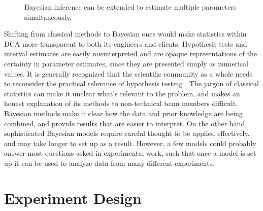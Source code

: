 \documentclass[11pt,a4paper,article]{memoir} %
\begin{document}
\begin{figure}
\centering
{}
\caption{Bayesian inference can be extended to estimate multiple parameters simultaneously.}
\label{fig:multiparameter_bayes}
\end{figure}

Shifting from classical methods to Bayesian ones would make statistics within DCA more transparent to both its engineers and clients. Hypothesis tests and interval estimates are easily misinterpreted and are opaque representations of the certainty in parameter estimates, since they are presented simply as numerical values. It is generally recognized that the scientific community as a whole needs to reconsider the practical relevance of hypothesis testing \cite{kruschke2017bayesian, gelman2017pvalue}. The jargon of classical statistics can make it unclear what's relevant to the problem, and makes an honest explanation of its methods to non-technical team members difficult. Bayesian methods make it clear how the data and prior knowledge are being combined, and provide results that are easier to interpret. On the other hand, sophisticated Bayesian models require careful thought to be applied effectively, and  may take longer to set up as a result. However, a few models could probably answer most questions asked in experimental work, such that once a model is set up it can be used to analyze data from many different experiments.

\section{Experiment Design}
\end{document}
